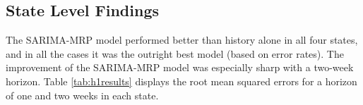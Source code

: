 \documentclass[fleqn,10pt]{wlscirep}
\begin{document}

\subsection*{State Level Findings}


The SARIMA-MRP model performed better than history alone in all four states, and in all the cases it was the outright best model (based on error rates). The improvement of the SARIMA-MRP model was especially sharp with a two-week horizon. Table \ref{tab:h1results} displays the root mean squared errors for a horizon of one and two weeks in each state. %

\begin{table}[tbp]
\centering
\caption{(h = 1 week/h = 2 weeks) RMSE}
\label{tab:h1results}
\end{table}
\end{document}
